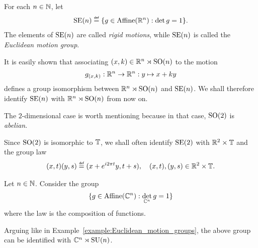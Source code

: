 \begin{example}
\label{example:Euclidean_motion_groups}
    For each $n \in \mathbb{N}$, let
    \begin{align*}
        \MotionGroup{n} \defeq \{g \in \AffineTransformations{\R^n} : \det g = 1\}.
    \end{align*}
    The elements of ${\mathrm{SE} (n)}$ are called \emph{rigid motions},
    while ${\mathrm{SE} (n)}$ is called the \emph{Euclidean motion group}.

    It is easily shown that associating $(x, k) \in \mathbb{R}^n \rtimes {\mathrm{SO} (n)}$ to the motion
    \begin{align*}
        g_{(x, k)} : \mathbb{R}^n \to \mathbb{R}^n : y \mapsto x + ky
    \end{align*}
    defines a group isomorphism between $\mathbb{R}^n \rtimes {\mathrm{SO} (n)}$ and ${\mathrm{SE} (n)}$.
    We shall therefore identify ${\mathrm{SE} (n)}$ with $\mathbb{R}^n \rtimes {\mathrm{SO} (n)}$ from now on.
\end{example}

\begin{example}
\label{example:Euclidean_motion_groups:dimension_2}
    The $2$-dimensional case is worth mentioning because
    in that case, ${\mathrm{SO} (2)}$ is \emph{abelian}.

    Since ${\mathrm{SO} (2)}$ is isomorphic to $\mathbb{T}$,
    we shall often identify ${\mathrm{SE} (2)}$ with $\mathbb{R}^2 \times \mathbb{T}$ and the group law
    \begin{align*}
        (x, t) (y, s) \defeq (x + \e^{\i \turn t} y, t + s), \quad (x, t), (y, s) \in \R^2 \times \T.
    \end{align*}
\end{example}

\begin{example}
    \label{example:complex_motion_groups}
    Let $n \in \mathbb{N}$.
    Consider the group
    \begin{align*}
        \{g \in {\mathrm{Affine} (\mathbb{C}^n)} : \det_{\mathbb{C}^n} g = 1\}
    \end{align*}
    where the law is the composition of functions.

    Arguing like in Example~\ref{example:Euclidean_motion_groups},
    the above group can be identified with $\mathbb{C}^n \rtimes {\mathrm{SU} (n)}$.
\end{example}

